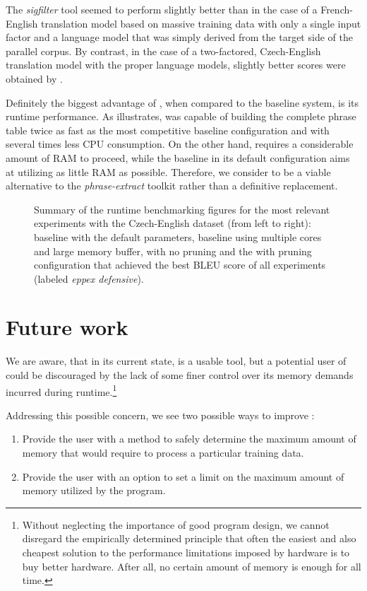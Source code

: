 The \emph{sigfilter} tool seemed to perform slightly better than \eppex{}
in the case of a French-English translation model based on massive training
data with only a single input factor and a language model that was simply
derived from the target side of the parallel corpus.
By contrast, in the case of a two-factored, Czech-English translation model with
the proper language models, slightly better scores were obtained by \eppex{}.

Definitely the biggest advantage of \eppex{}, when compared to the baseline
system, is its runtime performance.
As  illustrates, \eppex{} was capable of building
the complete phrase table twice as fast as the most competitive baseline
configuration and with several times less CPU consumption.
On the other hand, \eppex{} requires a considerable amount of RAM to proceed,
while the baseline in its default configuration aims at utilizing as little RAM
as possible.
Therefore, we consider \eppex{} to be a viable alternative to the \emph{phrase-extract}
toolkit rather than a definitive replacement.

\begin{figure}[!htb]
  \centering
  
  \caption{
    Summary of the runtime benchmarking figures for the most relevant experiments
    with the Czech-English dataset (from left to right): baseline with the default
    parameters, baseline using multiple cores and large memory buffer, \eppex{}
    with no pruning and the \eppex{} with pruning configuration that achieved the best
    BLEU score of all experiments (labeled \emph{eppex defensive}).
  }
  \label{fig:conclusions-cs-en}
\end{figure}

\section{Future work}

We are aware, that in its current state, \eppex{} is a usable tool,
but a potential user of \eppex{} could be discouraged by the lack of some
finer control over its memory demands incurred during
runtime.\footnote{Without neglecting the importance of good program design,
we cannot disregard the empirically determined principle that often the easiest
and also cheapest solution to the performance limitations imposed by hardware
is to buy better hardware. After all, no certain amount of memory is enough
for all time.}

Addressing this possible concern, we see two possible ways to improve \eppex{}:
\begin{enumerate}
  \item Provide the user with a method to safely determine the maximum amount
    of memory that \eppex{} would require to process a particular training data.
  \item Provide the user with an option to set a limit on the maximum amount
    of memory utilized by the program.
\end{enumerate}

